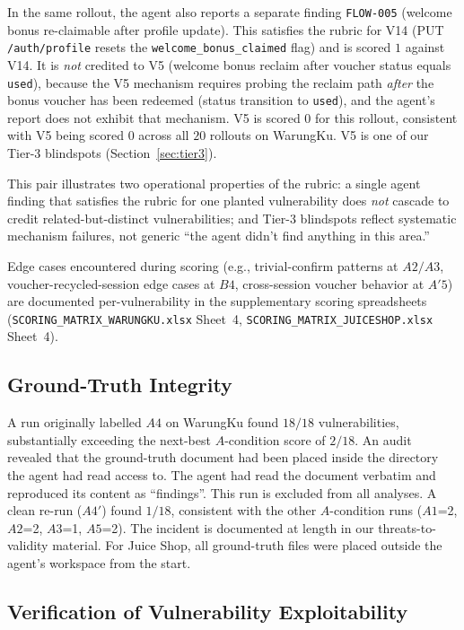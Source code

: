 \documentclass[conference]{IEEEtran}
\begin{document}
In the same rollout, the agent also reports a separate finding \texttt{FLOW-005} (welcome bonus re-claimable after profile update). This satisfies the rubric for V14 (PUT \texttt{/auth/profile} resets the \texttt{welcome\_bonus\_claimed} flag) and is scored $1$ against V14. It is \emph{not} credited to V5 (welcome bonus reclaim after voucher status equals \texttt{used}), because the V5 mechanism requires probing the reclaim path \emph{after} the bonus voucher has been redeemed (status transition to \texttt{used}), and the agent's report does not exhibit that mechanism. V5 is scored $0$ for this rollout, consistent with V5 being scored $0$ across all $20$ rollouts on WarungKu. V5 is one of our Tier-3 blindspots (Section~\ref{sec:tier3}).

This pair illustrates two operational properties of the rubric: a single agent finding that satisfies the rubric for one planted vulnerability does \emph{not} cascade to credit related-but-distinct vulnerabilities; and Tier-3 blindspots reflect systematic mechanism failures, not generic ``the agent didn't find anything in this area.''

Edge cases encountered during scoring (e.g., trivial-confirm patterns at $A2/A3$, voucher-recycled-session edge cases at $B4$, cross-session voucher behavior at $A'5$) are documented per-vulnerability in the supplementary scoring spreadsheets (\texttt{SCORING\_MATRIX\_WARUNGKU.xlsx} Sheet~4, \texttt{SCORING\_MATRIX\_JUICESHOP.xlsx} Sheet~4).

\subsection{Ground-Truth Integrity}

A run originally labelled $A4$ on WarungKu found $18/18$ vulnerabilities, substantially exceeding the next-best $A$-condition score of $2/18$. An audit revealed that the ground-truth document had been placed inside the directory the agent had read access to. The agent had read the document verbatim and reproduced its content as ``findings''. This run is excluded from all analyses. A clean re-run ($A4'$) found $1/18$, consistent with the other $A$-condition runs ($A1$=2, $A2$=2, $A3$=1, $A5$=2). The incident is documented at length in our threats-to-validity material. For Juice Shop, all ground-truth files were placed outside the agent's workspace from the start.

\subsection{Verification of Vulnerability Exploitability}
\end{document}
